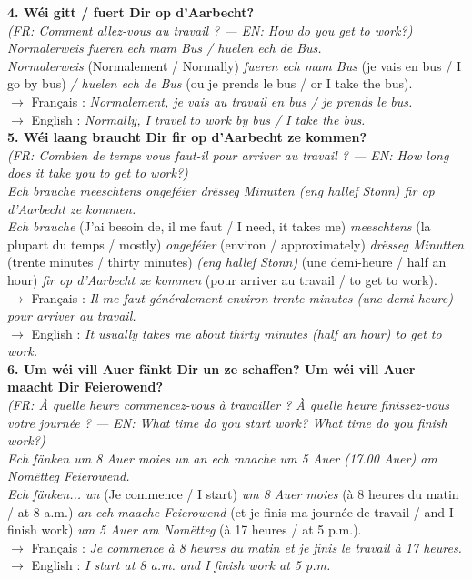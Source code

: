 \noindent\textbf{4. Wéi gitt / fuert Dir op d'Aarbecht?}\\
\textit{(FR: Comment allez-vous au travail ? — EN: How do you get to work?)}\\[0.3em]
\textit{Normalerweis fueren ech mam Bus / huelen ech de Bus.}\\
\textit{Normalerweis} (Normalement / Normally) \textit{fueren ech mam Bus} (je vais en bus / I go by bus) \textit{/ huelen ech de Bus} (ou je prends le bus / or I take the bus).\\
$\rightarrow$ Français : \textit{Normalement, je vais au travail en bus / je prends le bus.}\\
$\rightarrow$ English : \textit{Normally, I travel to work by bus / I take the bus.}\\[0.8em]

\noindent\textbf{5. Wéi laang braucht Dir fir op d'Aarbecht ze kommen?}\\
\textit{(FR: Combien de temps vous faut-il pour arriver au travail ? — EN: How long does it take you to get to work?)}\\[0.3em]
\textit{Ech brauche meeschtens ongeféier drësseg Minutten (eng hallef Stonn) fir op d'Aarbecht ze kommen.}\\
\textit{Ech brauche} (J'ai besoin de, il me faut / I need, it takes me) \textit{meeschtens} (la plupart du temps / mostly) \textit{ongeféier} (environ / approximately) \textit{drësseg Minutten} (trente minutes / thirty minutes) \textit{(eng hallef Stonn)} (une demi-heure / half an hour) \textit{fir op d'Aarbecht ze kommen} (pour arriver au travail / to get to work).\\
$\rightarrow$ Français : \textit{Il me faut généralement environ trente minutes (une demi-heure) pour arriver au travail.}\\
$\rightarrow$ English : \textit{It usually takes me about thirty minutes (half an hour) to get to work.}\\[0.8em]

\noindent\textbf{6. Um wéi vill Auer fänkt Dir un ze schaffen? Um wéi vill Auer maacht Dir Feierowend?}\\
\textit{(FR: À quelle heure commencez-vous à travailler ? À quelle heure finissez-vous votre journée ? — EN: What time do you start work? What time do you finish work?)}\\[0.3em]
\textit{Ech fänken um 8 Auer moies un an ech maache um 5 Auer (17.00 Auer) am Nomëtteg Feierowend.}\\
\textit{Ech fänken... un} (Je commence / I start) \textit{um 8 Auer moies} (à 8 heures du matin / at 8 a.m.) \textit{an ech maache Feierowend} (et je finis ma journée de travail / and I finish work) \textit{um 5 Auer am Nomëtteg} (à 17 heures / at 5 p.m.).\\
$\rightarrow$ Français : \textit{Je commence à 8 heures du matin et je finis le travail à 17 heures.}\\
$\rightarrow$ English : \textit{I start at 8 a.m. and I finish work at 5 p.m.}\\[0.8em]

